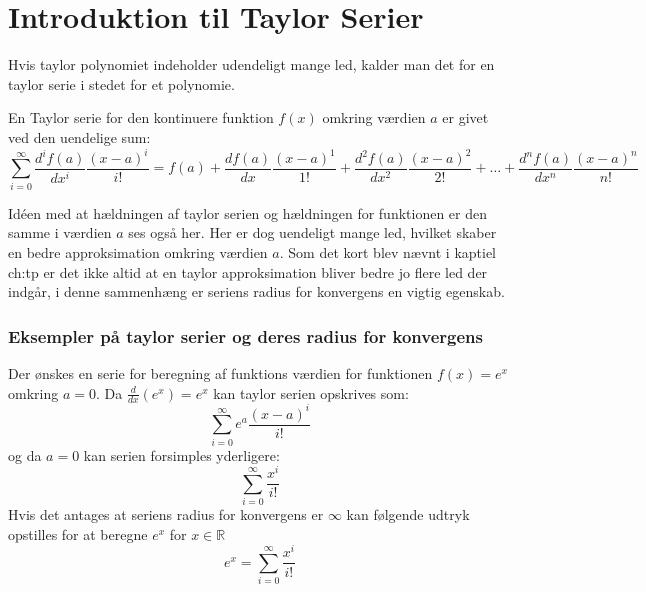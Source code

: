 \chapter{Introduktion til Taylor Serier}
\label{ch:ts}
Hvis taylor polynomiet indeholder udendeligt mange led, 
kalder man det for en taylor serie i stedet for et polynomie. 
\begin{defn}
    En Taylor serie for den kontinuere funktion $f(x)$ omkring værdien $a$ er givet ved den uendelige sum:
    \[
    \sum^{\infty}_{i=0} \frac{d^i f(a)}{dx^i} \frac{(x-a)^{i}}{i!} = f(a) + \frac{df(a)}{dx} \frac{(x-a)^{1}}{1!} + 
    \frac{d^{2}f(a)}{dx^{2}} \frac{(x-a)^{2}}{2!} + \ldots + \frac{d^{n} f(a)}{dx^{n}} \frac{(x-a)^n}{n!}
    \]
\end{defn}
\label{def:taylorSerie}
Idéen med at hældningen af taylor serien og hældningen for funktionen er den samme i værdien $a$ ses også her.
Her er dog uendeligt mange led, hvilket skaber en bedre approksimation omkring værdien $a$. 
Som det kort blev nævnt i kaptiel \refname{ch:tp} er det ikke altid at en taylor approksimation bliver bedre
jo flere led der indgår, i denne sammenhæng er seriens radius for konvergens en vigtig egenskab. %


\subsection*{Eksempler på taylor serier og deres radius for konvergens} 
Der ønskes en serie for beregning af funktions værdien for funktionen $f(x) = e^x$ omkring $a = 0$.
Da $\frac{d}{dx}(e^x) = e^x$ kan taylor serien opskrives som:
\[
\sum^\infty_{i = 0} e^a \frac{(x-a)^i}{i!}
\]
og da $a = 0$ kan serien forsimples yderligere:
\[
\sum^\infty_{i = 0} \frac{x^i}{i!}  
\]
Hvis det antages at seriens radius for konvergens er $\infty$ kan følgende udtryk opstilles for at beregne $e^x$ for $x \in \mathbb{R}$
\[
e^x = \sum^\infty_{i = 0} \frac{x^i}{i!}  
\]
